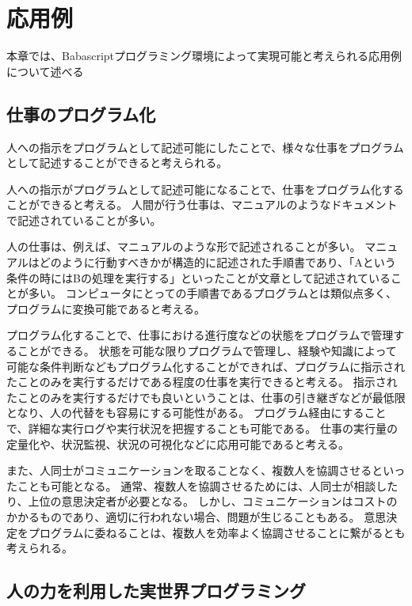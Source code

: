 \chapter{応用例}\label{chap:application}

本章では、Babascriptプログラミング環境によって実現可能と考えられる応用例について述べる

\section{仕事のプログラム化}\label{ux4ed5ux4e8bux306eux30d7ux30edux30b0ux30e9ux30e0ux5316}

人への指示をプログラムとして記述可能にしたことで、様々な仕事をプログラムとして記述することができると考えられる。

人への指示がプログラムとして記述可能になることで、仕事をプログラム化することができると考える。
人間が行う仕事は、マニュアルのようなドキュメントで記述されていることが多い。

人の仕事は、例えば、マニュアルのような形で記述されることが多い。
マニュアルはどのように行動すべきかが構造的に記述された手順書であり、「Aという条件の時にはBの処理を実行する」といったことが文章として記述されていることが多い。
コンピュータにとっての手順書であるプログラムとは類似点多く、プログラムに変換可能であると考える。

プログラム化することで、仕事における進行度などの状態をプログラムで管理することができる。
状態を可能な限りプログラムで管理し、経験や知識によって可能な条件判断などもプログラム化することができれば、プログラムに指示されたことのみを実行するだけである程度の仕事を実行できると考える。
指示されたことのみを実行するだけでも良いということは、仕事の引き継ぎなどが最低限となり、人の代替をも容易にする可能性がある。
プログラム経由にすることで、詳細な実行ログや実行状況を把握することも可能である。
仕事の実行量の定量化や、状況監視、状況の可視化などに応用可能であると考える。

また、人同士がコミュニケーションを取ることなく、複数人を協調させるといったことも可能となる。
通常、複数人を協調させるためには、人同士が相談したり、上位の意思決定者が必要となる。
しかし、コミュニケーションはコストのかかるものであり、適切に行われない場合、問題が生じることもある。
意思決定をプログラムに委ねることは、複数人を効率よく協調させることに繋がるとも考えられる。

\section{人の力を利用した実世界プログラミング}\label{ux4ebaux306eux529bux3092ux5229ux7528ux3057ux305fux5b9fux4e16ux754cux30d7ux30edux30b0ux30e9ux30dfux30f3ux30b0}

